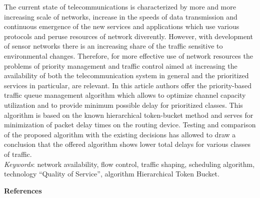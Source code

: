 {{\leftskip=7mm\noindent The current state of telecommunications is
characterized by more and more increasing scale of networks,
increase in the speeds of data transmission and continuous
emergence of the new services and applications which use various
protocols and peruse resources of network diverently. However,
with development of sensor networks there is an increasing share
of the traffic sensitive to environmental changes. Therefore, for
more effective use of network resources the problems of priority
management and traffic control aimed at increasing the
availability of both the telecommunication system in general and
the prioritized services in particular, are relevant. In this
article authors offer the priority-based traffic queue management
algorithm which allows to optimize channel capacity utilization
and to provide minimum possible delay for prioritized classes.
This algorithm is based on the known hierarchical token-bucket
method and serves for minimization of packet delay times on the
routing device. Testing and comparison of the proposed algorithm
with the existing decisions has allowed to draw a conclusion that
the offered algorithm shows lower total delays for various classes
of traffic.\\[1mm]
\textit{Keywords}: network availability, flow control, traffic
shaping, scheduling algorithm, technology ``Quality of Service'',
algorithm Hierarchical Token Bucket.
\par}

\vskip5mm

\noindent \textbf{References} }

\vskip 2mm


